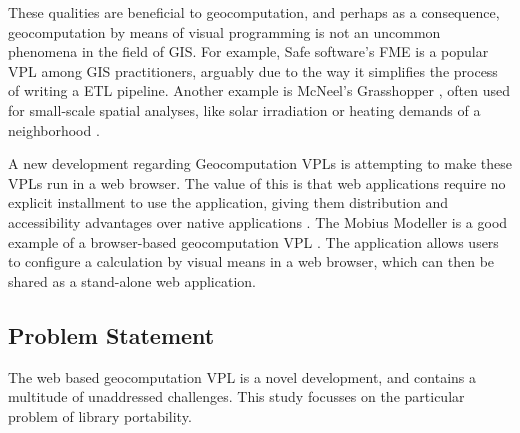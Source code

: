 These qualities are beneficial to geocomputation, and perhaps as a consequence, geocomputation by means of visual programming is not an uncommon phenomena in the field of \ac{GIS}.
For example, Safe software's FME \citep{safe-software_fme_2022} is a popular \ac{VPL} among \ac{GIS} practitioners, arguably due to the way it simplifies the process of writing a \ac{ETL} pipeline. 
Another example is McNeel's Grasshopper \citep{rutten_grasshopper_2012}, often used for small-scale spatial analyses, like solar irradiation or heating demands of a neighborhood \citep{sadeghipour_roudsari_ladybug_2013}. 

A new development regarding Geocomputation VPLs is attempting to make these VPLs run in a web browser.
The value of this is that web applications require no explicit installment to use the application, giving them distribution and accessibility advantages over native applications \citep{kuhail_characterizing_2021, panidi_hybrid_2015}. 
The Mobius Modeller is a good example of a browser-based geocomputation VPL \citep{janssen_mobius_2021}.
The application allows users to configure a calculation by visual means in a web browser, which can then be shared as a stand-alone web application. 




\subsection*{Problem Statement}
  
The web based geocomputation VPL is a novel development, and contains a multitude of unaddressed challenges.
This study focusses on the particular problem of library portability. %

